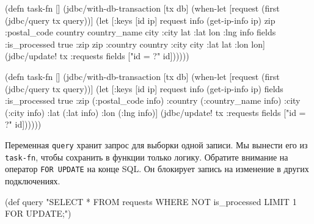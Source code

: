 
\ifx\DEVICETYPE\MOBILE

\begin{english}
  \begin{clojure/lines}
(defn task-fn []
 (jdbc/with-db-transaction [tx db]
  (when-let [request
             (first
              (jdbc/query tx query))]
    (let [{:keys [id ip]} request
          info   (get-ip-info ip)
          {zip :postal_code
           country country_name
           city :city lat :lat
           lon :lng} info
          fields {:is_processed true
                  :zip zip
                  :country country
                  :city city
                  :lat lat
                  :lon lon}]
      (jdbc/update! tx :requests
        fields ["id = ?" id])))))
  \end{clojure/lines}
\end{english}

\else

\begin{english}
  \begin{clojure/lines}
(defn task-fn []
  (jdbc/with-db-transaction [tx db]
    (when-let [request (first (jdbc/query tx query))]
      (let [{:keys [id ip]} request
            info   (get-ip-info ip)
            fields {:is_processed true
                    :zip (:postal_code info)
                    :country (:country_name info)
                    :city (:city info)
                    :lat (:lat info)
                    :lon (:lng info)}]
        (jdbc/update! tx :requests
                      fields
                      ["id = ?" id])))))
  \end{clojure/lines}
\end{english}

\fi


Переменная \verb|query| хранит запрос для выборки одной записи. Мы вынести его
из \verb|task-fn|, чтобы сохранить в функции только логику. Обратите внимание на
оператор \verb|FOR UPDATE| на конце SQL. Он блокирует запись на изменение в
других подключениях.

\ifx\DEVICETYPE\MOBILE

\begin{english}
  \begin{clojure}
(def query
  "SELECT * FROM requests
   WHERE NOT is_processed
   LIMIT 1 FOR UPDATE;")
  \end{clojure}
\end{english}

